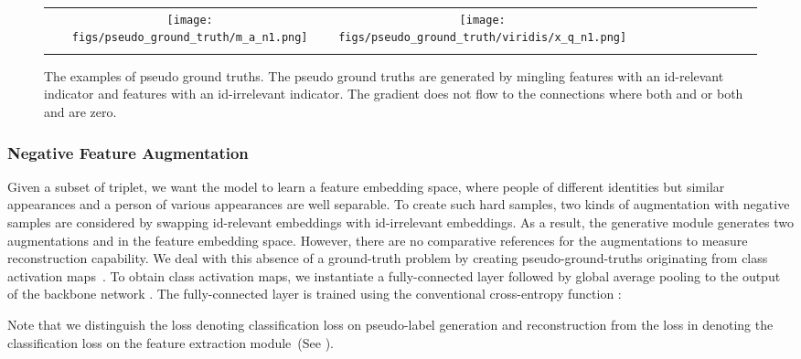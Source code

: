 \begin{figure*}[!t]
\begin{tabular}{cccccc|cccccc}
    & \texttt{[image: figs/pseudo\_ground\_truth/m\_a\_n1.png]} & \texttt{[image: figs/pseudo\_ground\_truth/viridis/x\_q\_n1.png]} \\
     & {\small } & {\small } &  &  &  &
 & {\small } & {\small } &  &  &  \vspace{0.1cm} \\
    \end{tabular}
    \caption{The examples of pseudo ground truths. The pseudo ground truths are generated by mingling features with an id-relevant indicator and features with an id-irrelevant indicator. The gradient does not flow to the connections where both  and  or both  and  are zero. \vspace{-0.2cm}} \label{fig:pseudo-ground-truth}
\end{figure*}
 
\subsubsection{Negative Feature Augmentation}
Given a subset  of triplet, we want the model to learn a feature embedding space, where people of different identities but similar appearances and a person of various appearances are well separable. To create such hard samples, two kinds of augmentation with negative samples are considered by swapping id-relevant embeddings with id-irrelevant embeddings. 
As a result, the generative module generates two augmentations  and  in the feature embedding space. However, there are no comparative references for the augmentations to measure reconstruction capability. We deal with this absence of a ground-truth problem by creating pseudo-ground-truths originating from class activation maps~\cite{zhou2016learning}. To obtain class activation maps, we instantiate a fully-connected layer followed by global average pooling to the output of the backbone network . The fully-connected layer is trained using the conventional cross-entropy function :

Note that we distinguish the loss  denoting classification loss on pseudo-label generation and reconstruction from the loss  in  denoting the classification loss on the feature extraction module~(See ). 

